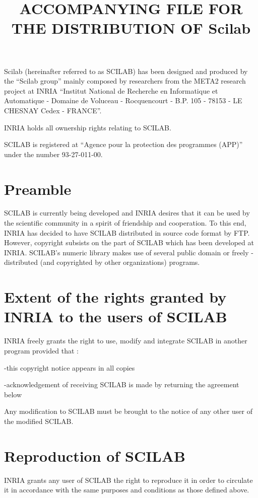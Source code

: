 \textheight=680pt \textwidth=470pt
\topmargin=-117pt
\oddsidemargin=0pt \evensidemargin=0pt \marginparwidth=60pt
\title{ACCOMPANYING FILE FOR THE DISTRIBUTION OF Scilab}
\author{ }
\date{ }

\maketitle{}
\thispagestyle{empty}
\pagestyle{empty}
Scilab (hereinafter referred to as SCILAB) has been 
designed and produced  by the ``Scilab group'' mainly
composed by researchers from the META2 research project at INRIA 
``Institut National de Recherche en Informatique et Automatique - Domaine de
Voluceau - Rocquencourt - B.P. 105 - 78153 - LE CHESNAY Cedex - FRANCE''.

INRIA holds all ownership rights relating to SCILAB.

SCILAB is registered at ``Agence pour la protection des programmes (APP)''
under the number 93-27-011-00.

\section{Preamble}
SCILAB is currently being developed and INRIA desires that it can be used by
the scientific community in a spirit of friendship and cooperation. To this
end, INRIA has decided to have SCILAB distributed in source code format by
FTP. However, copyright subsists on the part of SCILAB which has been 
developed at INRIA. SCILAB's numeric library makes use of several public
domain or freely - distributed (and copyrighted by other organizations)
programs.

\section{Extent of the rights granted by INRIA to the users of SCILAB}
INRIA freely grants the right to use, modify and integrate SCILAB in another
program provided that :

-this copyright notice appears in all copies

-acknowledgement of receiving SCILAB is made by returning the agreement below

\noindent
Any modification to SCILAB must be brought to the notice of any other user of
the modified SCILAB.

\section{Reproduction of SCILAB}
INRIA grants any user of SCILAB the right to reproduce it in order to
circulate it in accordance with the same purposes and conditions as those
defined above.

